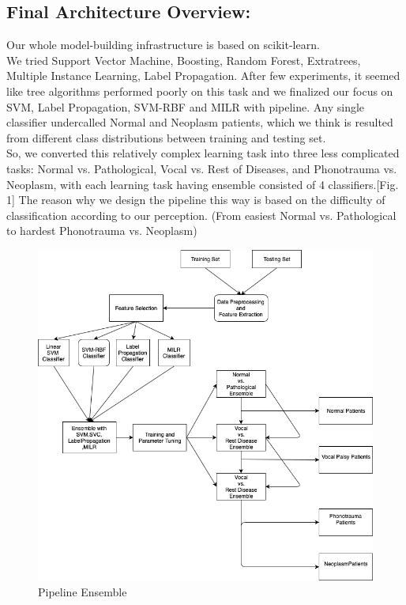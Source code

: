 \subsection{Final Architecture Overview:}
	Our whole model-building infrastructure is based on scikit-learn\cite{b7}\cite{b8}. \\
	\indent We tried Support Vector Machine, Boosting, Random Forest, Extratrees, Multiple Instance Learning, Label Propagation. After few experiments, it seemed like tree algorithms performed poorly on this task and we finalized our focus on SVM, Label Propagation, SVM-RBF and MILR with pipeline. Any single classifier undercalled Normal and Neoplasm patients, which we think is resulted from different class distributions between training and testing set. \\
\indent So, we converted this relatively complex learning task into three less complicated tasks: Normal vs. Pathological, Vocal vs. Rest of Diseases, and Phonotrauma vs. Neoplasm, with each learning task having ensemble consisted of 4 classifiers.[Fig. 1] The reason why we design the pipeline this way is based on the difficulty of classification according to our perception. (From easiest Normal vs. Pathological to hardest Phonotrauma vs. Neoplasm)\\
	\begin{figure}[!htbp]
		\begin{center}
			\includegraphics[scale=0.4]{Diagram_2.png}
		\end{center}
		\caption{Pipeline Ensemble}
	\end{figure}

